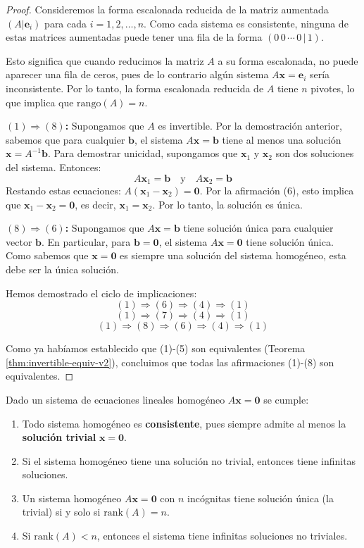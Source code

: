 \begin{proof}
Consideremos la forma escalonada reducida de la matriz aumentada $(A|\mathbf{e}_i)$ para cada $i = 1, 2, \ldots, n$. Como cada sistema es consistente, ninguna de estas matrices aumentadas puede tener una fila de la forma $(0 \, 0 \, \cdots \, 0 \, | \, 1)$.

Esto significa que cuando reducimos la matriz $A$ a su forma escalonada, no puede aparecer una fila de ceros, pues de lo contrario algún sistema $A\mathbf{x}=\mathbf{e}_i$ sería inconsistente. Por lo tanto, la forma escalonada reducida de $A$ tiene $n$ pivotes, lo que implica que $\text{rango}(A) = n$.

\textbf{$(1) \Rightarrow (8)$:}
Supongamos que $A$ es invertible. Por la demostración anterior, sabemos que para cualquier $\mathbf{b}$, el sistema $A\mathbf{x}=\mathbf{b}$ tiene al menos una solución $\mathbf{x} = A^{-1}\mathbf{b}$. Para demostrar unicidad, supongamos que $\mathbf{x}_1$ y $\mathbf{x}_2$ son dos soluciones del sistema. Entonces:
$$A\mathbf{x}_1 = \mathbf{b} \quad \text{y} \quad A\mathbf{x}_2 = \mathbf{b}$$
Restando estas ecuaciones: $A(\mathbf{x}_1 - \mathbf{x}_2) = \mathbf{0}$. Por la afirmación (6), esto implica que $\mathbf{x}_1 - \mathbf{x}_2 = \mathbf{0}$, es decir, $\mathbf{x}_1 = \mathbf{x}_2$. Por lo tanto, la solución es única.

\textbf{$(8) \Rightarrow (6)$:}
Supongamos que $A\mathbf{x}=\mathbf{b}$ tiene solución única para cualquier vector $\mathbf{b}$. En particular, para $\mathbf{b} = \mathbf{0}$, el sistema $A\mathbf{x}=\mathbf{0}$ tiene solución única. Como sabemos que $\mathbf{x} = \mathbf{0}$ es siempre una solución del sistema homogéneo, esta debe ser la única solución.

Hemos demostrado el ciclo de implicaciones:
$$(1) \Rightarrow (6) \Rightarrow (4) \Rightarrow (1)$$
$$(1) \Rightarrow (7) \Rightarrow (4) \Rightarrow (1)$$  
$$(1) \Rightarrow (8) \Rightarrow (6) \Rightarrow (4) \Rightarrow (1)$$

Como ya habíamos establecido que (1)-(5) son equivalentes (Teorema \ref{thm:invertible-equiv-v2}), concluimos que todas las afirmaciones (1)-(8) son equivalentes.
\end{proof}

\begin{theorem} 
Dado un sistema de ecuaciones lineales homogéneo $A\mathbf{x}=\mathbf{0}$ se cumple:
\begin{enumerate}
\item Todo sistema homogéneo es \textbf{consistente}, pues siempre admite al menos la \textbf{solución trivial} $\mathbf{x} = \mathbf{0}$.
\item Si el sistema homogéneo tiene una solución no trivial, entonces tiene infinitas soluciones.
\item Un sistema homogéneo $A\mathbf{x} = \mathbf{0}$ con $n$ incógnitas tiene solución única (la trivial) si y solo si $\text{rank}(A) = n$.
\item Si $\text{rank}(A) < n$, entonces el sistema tiene infinitas soluciones no triviales.
\end{enumerate}
\end{theorem}


